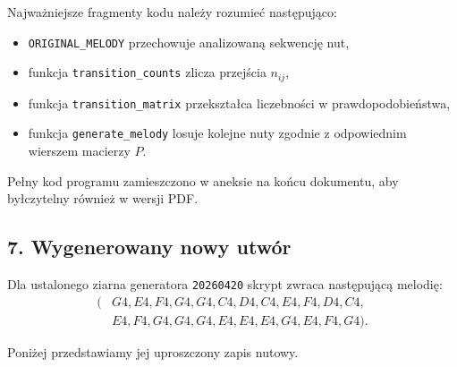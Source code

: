 \documentclass[11pt,a4paper]{article}
\theoremstyle{plain}
\theoremstyle{definition}
\newcommand{\stafflines}[2]{%
    \foreach \yy in {0,0.5,1,1.5,2} {
        \draw[gray!70] (0,{#1+\yy}) -- (#2,{#1+\yy});
    }
}
\newcommand{\quarternote}[2]{%
    \filldraw[fill=white] (#1,#2) ellipse (0.16 and 0.11);
    \draw ({#1+0.16},#2) -- ({#1+0.16},{#2+1.1});
}
\newcommand{\ledgernote}[2]{%
    \filldraw[fill=white] (#1,#2) ellipse (0.16 and 0.11);
    \draw ({#1-0.28},#2) -- ({#1+0.28},#2);
    \draw ({#1+0.16},#2) -- ({#1+0.16},{#2+1.1});
}
\begin{document}
\begin{rozwiazaniebox}
Najwa\.zniejsze fragmenty kodu nale\.zy rozumie\'c nast\k{e}puj\k{a}co:
\begin{itemize}
    \item \texttt{ORIGINAL\_MELODY} przechowuje analizowan\k{a} sekwencj\k{e} nut,
    \item funkcja \texttt{transition\_counts} zlicza przej\'scia \(n_{ij}\),
    \item funkcja \texttt{transition\_matrix} przekszta\l ca liczebno\'sci w prawdopodobie\'nstwa,
    \item funkcja \texttt{generate\_melody} losuje kolejne nuty zgodnie z odpowiednim wierszem macierzy \(P\).
\end{itemize}

Pe\l ny kod programu zamieszczono w aneksie na ko\'ncu dokumentu, aby by\l czytelny r\'ownie\.z w wersji PDF.

\subsection*{7. Wygenerowany nowy utw\'or}

Dla ustalonego ziarna generatora \texttt{20260420} skrypt zwraca nast\k{e}puj\k{a}c\k{a} melodi\k{e}:
\[
\begin{aligned}
    (&G4,E4,F4,G4,G4,C4,D4,C4,E4,F4,D4,C4,\\
     &E4,F4,G4,G4,G4,E4,E4,E4,G4,E4,F4,G4).
\end{aligned}
\]

Poni\.zej przedstawiamy jej uproszczony zapis nutowy.

\begin{center}
\end{center}

\end{rozwiazaniebox}
\end{document}
